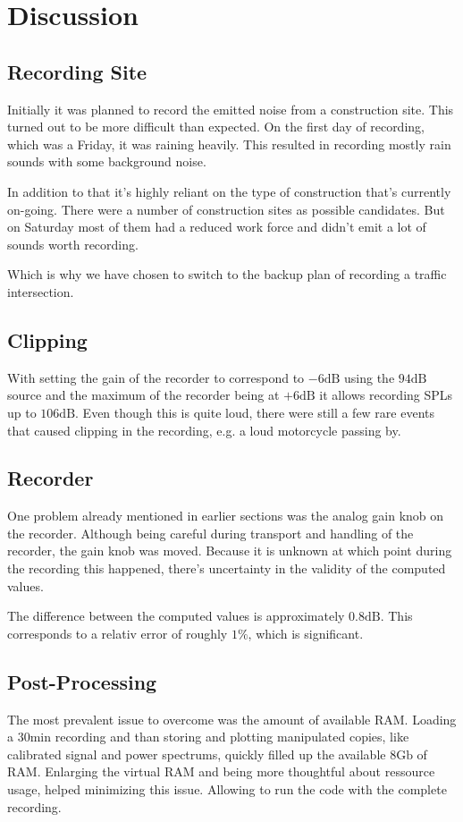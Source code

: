 \documentclass[twocolumn]{article}
\begin{document}
\section{Discussion}
\subsection{Recording Site}
Initially it was planned to record the emitted noise from a construction site.
This turned out to be more difficult than expected.
On the first day of recording, which was a Friday, it was raining heavily.
This resulted in recording mostly rain sounds with some background noise.

In addition to that it's highly reliant on the type of construction that's currently on-going.
There were a number of construction sites as possible candidates.
But on Saturday most of them had a reduced work force and didn't emit a lot of sounds
worth recording.

Which is why we have chosen to switch to the backup plan of recording a traffic intersection.

\subsection{Clipping}
With setting the gain of the recorder to correspond to $-6 \textrm{dB}$ using the $94 \textrm{dB}$ source
and the maximum of the recorder being at $+6 \textrm{dB}$ it allows recording SPLs up to $106 \textrm{dB}$.
Even though this is quite loud, there were still a few rare events that caused clipping in the recording,
e.g. a loud motorcycle passing by.


\subsection{Recorder}
\label{subsec:recorder}
One problem already mentioned in earlier sections was the analog gain knob on the recorder.
Although being careful during transport and handling of the recorder, the gain knob was moved.
Because it is unknown at which point during the recording this happened, there's uncertainty
in the validity of the computed values.

The difference between the computed values is approximately $0.8 \textrm{dB}$.
This corresponds to a relativ error of roughly $1\%$, which is significant.


\subsection{Post-Processing}
The most prevalent issue to overcome was the amount of available RAM.
Loading a $30\textrm{min}$ recording and than storing and plotting manipulated copies, like calibrated
signal and power spectrums, quickly filled up the available $8\textrm{Gb}$ of RAM.
Enlarging the virtual RAM and being more thoughtful about ressource usage, helped minimizing this
issue. Allowing to run the code with the complete recording.
\end{document}
